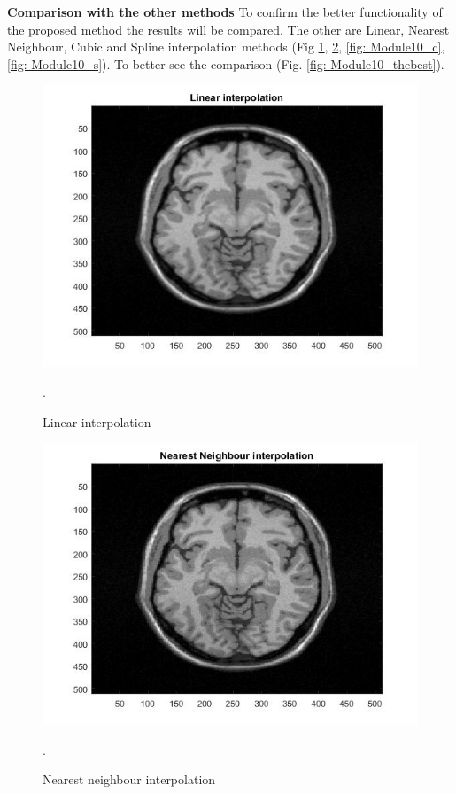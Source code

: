 \textbf{Comparison with the other methods}
\newline To confirm the better functionality of the proposed method the results will be compared. The other are Linear, Nearest Neighbour, Cubic and Spline interpolation methods (Fig \ref{fig: Module10_l}, \ref{fig: Module10_NN}, \ref{fig: Module10_c}, \ref{fig: Module10_s}). To better see the comparison (Fig. \ref{fig: Module10_thebest}).

\begin{figure}[H]
\centering{}\includegraphics[scale=0.4]{figures/Module_10/Module_10_l}\caption{Linear interpolation}. 
\label{fig: Module10_l}
\end{figure}

\begin{figure}[H]
\centering{}\includegraphics[scale=0.4]{figures/Module_10/Module_10_NN}\caption{Nearest neighbour interpolation}. 
\label{fig: Module10_NN}
\end{figure}

